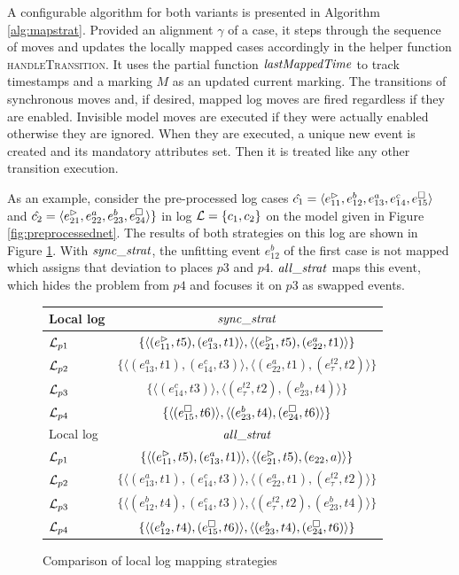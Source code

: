 A configurable algorithm for both variants is presented in Algorithm \ref{alg:mapstrat}. Provided an alignment $\gamma$ of a case, it steps through the sequence of moves and updates the locally mapped cases accordingly in the helper function \textsc{handleTransition}. It uses the partial function $\mathit{lastMappedTime}$ to track timestamps and a marking $M$ as an updated current marking. The transitions of synchronous moves and, if desired, mapped log moves are fired regardless if they are enabled. Invisible model moves are executed if they were actually enabled otherwise they are ignored. When they are executed, a unique new event is created and its mandatory attributes set. Then it is treated like any other transition execution.

As an example, consider the pre-processed log cases $\hat{c_1} = \langle e_{11}^\rhd, e_{12}^b, e_{13}^a, e_{14}^c, e_{15}^\square \rangle$ and $\hat{c_2} = \langle e_{21}^\rhd, e_{22}^a, e_{23}^b, e_{24}^\square \rangle \}$ in log $\mathcal{L} = \{ c_1, c_2\}$ on the model given in Figure \ref{fig:preprocessednet}. The results of both strategies on this log are shown in Figure \ref{fig:mapstrats}. With $\mathit{sync\_strat}$, the unfitting event $e_{12}^b$ of the first case is not mapped which assigns that deviation to places $p3$ and $p4$. $\mathit{all\_strat}$ maps this event, which hides the problem from $p4$ and focuses it on $p3$ as swapped events.
\begin{figure}
    \centering
    \begin{tabular}{|l|c|}
    \hline
    Local log & $\mathit{sync\_strat}$  \\
    \hline
    $\mathcal{L}_{p1}$ 
    & $\{ \langle (e_{11}^\rhd,t5),(e_{13}^a,t1) \rangle, \langle (e_{21}^\rhd,t5), (e_{22}^a,t1) \rangle \}$ 
     \\
    $\mathcal{L}_{p2}$ 
    & $\{ \langle (e_{13}^a,t1), (e_{14}^c,t3) \rangle, \langle (e_{22}^a,t1),(e_{\tau}^{t2},t2) \rangle \}$ 
    \\
    $\mathcal{L}_{p3}$ 
    & $\{ \langle (e_{14}^c,t3) \rangle, \langle (e_{\tau}^{t2},t2),(e_{23}^b, t4) \rangle \}$ 
    \\
    $\mathcal{L}_{p4}$ 
    & $\{ \langle (e_{15}^\square, t6) \rangle, \langle (e_{23}^b,t4),(e_{24}^\square, t6) \rangle \}$ 
    \\
    \hline
    \hline
    Local log & $\mathit{all\_strat}$ \\
    \hline
    $\mathcal{L}_{p1}$ & $\{ \langle (e_{11}^\rhd,t5),(e_{13}^a,t1) \rangle, \langle (e_{21}^\rhd,t5), (e_{22},a) \rangle \}$ \\
    $\mathcal{L}_{p2}$ & $\{ \langle (e_{13}^a,t1), (e_{14}^c,t3) \rangle, \langle (e_{22}^a,t1),(e_{\tau}^{t2},t2) \rangle \}$ \\
    $\mathcal{L}_{p3}$ & $\{ \langle (e_{12}^b,t4),(e_{14}^c,t3) \rangle, \langle (e_{\tau}^{t2},t2), (e_{23}^b,t4) \rangle \}$ \\
    $\mathcal{L}_{p4}$ & $\{ \langle (e_{12}^b,t4),(e_{15}^\square,t6) \rangle, \langle (e_{23}^b,t4),(e_{24}^\square,t6) \rangle \}$ \\
    \hline
    \end{tabular}
    \caption{Comparison of local log mapping strategies}
    \label{fig:mapstrats}
\end{figure}

